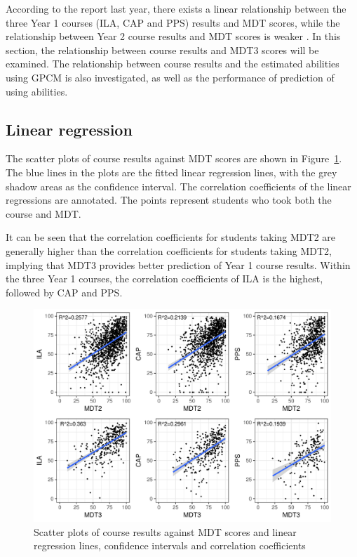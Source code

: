 \documentclass[a4paper]{report}
\begin{document}
According to the report last year, there exists a linear relationship between the three Year 1 courses (ILA, CAP and PPS) results and MDT scores, while the relationship between Year 2 course results and MDT scores is weaker \cite{lastyear}. In this section, the relationship between course results and MDT3 scores will be examined. The relationship between course results and the estimated abilities using GPCM is also investigated, as well as the performance of prediction of using abilities. 

\subsection{Linear regression}

The scatter plots of course results against MDT scores are shown in Figure~\ref{fig:REL_scatter_DT}. The blue lines in the plots are the fitted linear regression lines, with the grey shadow areas as the confidence interval. The correlation coefficients of the linear regressions are annotated. The points represent students who took both the course and MDT. 

It can be seen that the correlation coefficients for students taking MDT2 are generally higher than the correlation coefficients for students taking MDT2, implying that MDT3 provides better prediction of Year 1 course results. Within the three Year 1 courses, the correlation coefficients of ILA is the highest, followed by CAP and PPS. 

\begin{figure}[H]
  \centering
  \includegraphics[width=\linewidth]{fig/REL_scatter_DT.pdf}
  \caption{\label{fig:REL_scatter_DT}Scatter plots of course results against MDT scores and linear regression lines, confidence intervals and correlation coefficients}
\end{figure}
\end{document}
